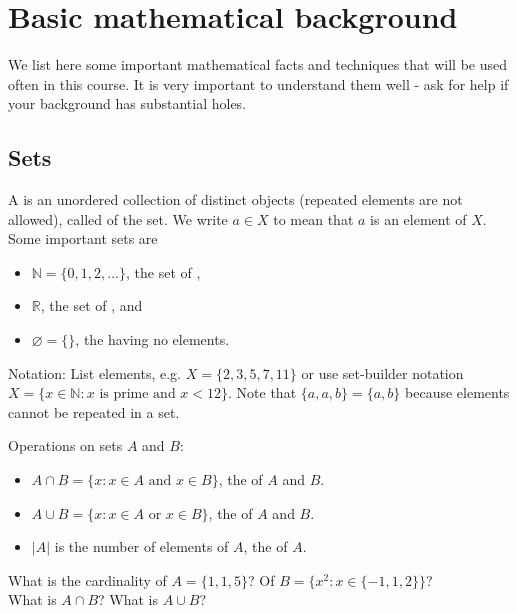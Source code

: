 \chapter{Basic mathematical background}
\label{ch:app:mathtools}

We list here some important mathematical facts and techniques  that will be used often in this course. 
It is very important to understand them well - ask for help if your background has substantial holes.

\section{Sets}
A  is an unordered collection of distinct objects (repeated elements are not allowed), called  of the set. 
We write $a \in X$ to mean that $a$ is an element of $X$. Some important sets are 
\begin{itemize}
\item $\mathbb{N} = \{0, 1, 2, \dots\}$, the set of ,
\item $\mathbb{R}$, the set of , and
\item $\varnothing = \{\}$, the  having no elements.
\end{itemize}

Notation: List elements, e.g. $X = \{2,3,5,7,11\}$ or use set-builder notation $X = \{x \in \mathbb{N} : x \text{ is prime and } x < 12\}$. 
Note that $\{a, a, b\} = \{a, b\}$ because elements cannot be repeated in a set.

Operations on sets $A$ and $B$: 
\begin{itemize}
\item $A\cap B = \{x: x \in A \text{ and } x \in B\}$, the  of $A$ and $B$.
\item $A\cup B = \{x: x \in A \text{ or  } x \in B\}$, the  of $A$ and $B$.
\item $|A|$ is the number of elements of $A$, the  of $A$.
\end{itemize}

\begin{Boxample}[2.5]
What is the cardinality of $A = \{1,1,5\}$? Of $B = \{x^2 : x \in \{-1,1,2\}\}$?\\

\vspace{2cm}
What is $A \cap B$? What is $A \cup B$?
\end{Boxample}


